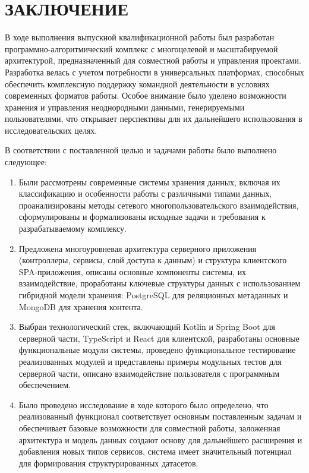 \chapter*{ЗАКЛЮЧЕНИЕ}

В ходе выполнения выпускной квалификационной работы был разработан программно-алгоритмический комплекс с многоцелевой и масштабируемой архитектурой, предназначенный для совместной работы и управления проектами. 
Разработка велась с учетом потребности в универсальных платформах, способных обеспечить комплексную поддержку командной деятельности в условиях современных форматов работы. 
Особое внимание было уделено возможности хранения и управления неоднородными данными, генерируемыми пользователями, что открывает перспективы для их дальнейшего использования в исследовательских целях.

В соответствии с поставленной целью и задачами работы было выполнено следующее:
\begin{enumerate}[wide=12.5mm, leftmargin=12.5mm]
    \item Были рассмотрены современные системы хранения данных, включая их классификацию и особенности работы с различными типами данных, проанализированы методы сетевого многопользовательского взаимодействия, сформулированы и формализованы исходные задачи и требования к разрабатываемому комплексу.
    \item Предложена многоуровневая архитектура серверного приложения (контроллеры, сервисы, слой доступа к данным) и структура клиентского SPA-приложения, описаны основные компоненты системы, их взаимодействие, проработаны ключевые структуры данных с использованием гибридной модели хранения: PostgreSQL для реляционных метаданных и MongoDB для хранения контента.
    \item Выбран технологический стек, включающий Kotlin и Spring Boot для серверной части, TypeScript и React для клиентской, разработаны основные функциональные модули системы, проведено функциональное тестирование реализованных модулей и представлены примеры модульных тестов для серверной части, описано взаимодействие пользователя с программным обеспечением.
    \item Было проведено исследование в ходе которого было определено, что реализованный функционал соответствует основным поставленным задачам и обеспечивает базовые возможности для совместной работы, заложенная архитектура и модель данных создают основу для дальнейшего расширения и добавления новых типов сервисов, система имеет значительный потенциал для формирования структурированных датасетов.
\end{enumerate}

